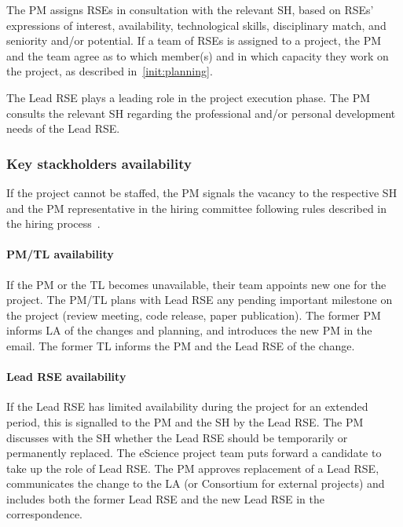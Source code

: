 The PM assigns RSEs in consultation with the
relevant SH, based on RSEs' expressions of interest, availability, technological skills, 
disciplinary match, and seniority and/or potential. 
%
If a team of RSEs is assigned to a project, the PM and the team agree as to which member(s) and in
which capacity they work on the project, as described in~\ref{init:planning}. %

The Lead RSE plays a leading role in the project execution phase. The PM consults the relevant SH regarding the
professional and/or personal development needs of the Lead RSE.


\subsubsection{Key stackholders availability}

If %
the project cannot be staffed, the PM signals the vacancy to the respective
SH and the PM representative in the hiring committee following rules described in the hiring process~\cite{hiring-intranet}.

\paragraph{PM/TL availability} If the PM or the TL becomes unavailable, their team appoints new one for the project.
The PM/TL plans with Lead RSE any pending important milestone on the project (review meeting, code release, paper publication).
The former PM informs LA of the changes and planning, and introduces the new PM in the email. The former TL informs the PM and the Lead RSE of the change.

\paragraph{Lead RSE availability}
If the Lead RSE has limited availability during the project for an extended period, this is signalled to the PM and the
SH by the Lead RSE. The PM discusses with the SH whether the Lead RSE should be temporarily or permanently replaced.
The eScience project team puts forward a candidate to take up the role of Lead RSE. The PM approves replacement of a Lead RSE, 
communicates the change to the LA (or Consortium for external projects) and includes both the former Lead RSE and the
new Lead RSE in the correspondence.

